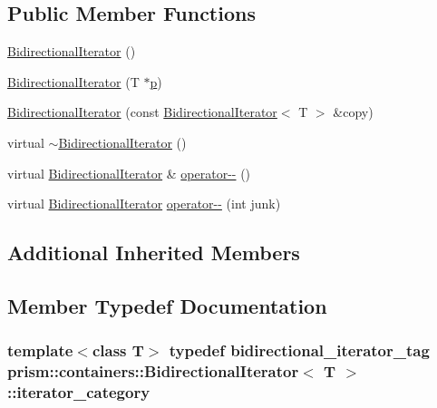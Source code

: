 \subsection*{Public Member Functions}
\begin{DoxyCompactItemize}
\item 
\hyperlink{classprism_1_1containers_1_1_bidirectional_iterator_a932401a5db7c0166a3e655dd37df9ea6}{Bidirectional\+Iterator} ()
\item 
\hyperlink{classprism_1_1containers_1_1_bidirectional_iterator_a5366bfe17fa530a679e3e43439ecec35}{Bidirectional\+Iterator} (T $\ast$\hyperlink{classprism_1_1containers_1_1_forward_iterator_afae3bf32acc98ab535b9bdb8156ba58f}{p})
\item 
\hyperlink{classprism_1_1containers_1_1_bidirectional_iterator_a421e8fc74e3aff457dc211cf14d85a6b}{Bidirectional\+Iterator} (const \hyperlink{classprism_1_1containers_1_1_bidirectional_iterator}{Bidirectional\+Iterator}$<$ T $>$ \&copy)
\item 
virtual \hyperlink{classprism_1_1containers_1_1_bidirectional_iterator_aa8283beed2192475ed3ec95c1fe319c1}{$\sim$\+Bidirectional\+Iterator} ()
\item 
virtual \hyperlink{classprism_1_1containers_1_1_bidirectional_iterator}{Bidirectional\+Iterator} \& \hyperlink{classprism_1_1containers_1_1_bidirectional_iterator_a39b0a415980fcfa4c4fa7b1b1786e77b}{operator-\/-\/} ()
\item 
virtual \hyperlink{classprism_1_1containers_1_1_bidirectional_iterator}{Bidirectional\+Iterator} \hyperlink{classprism_1_1containers_1_1_bidirectional_iterator_a1b36301da438a0f940e13df25aecdb10}{operator-\/-\/} (int junk)
\end{DoxyCompactItemize}
\subsection*{Additional Inherited Members}


\subsection{Member Typedef Documentation}
\subsubsection[{\texorpdfstring{iterator\+\_\+category}{iterator_category}}]{\setlength{\rightskip}{0pt plus 5cm}template$<$class T$>$ typedef {\bf bidirectional\+\_\+iterator\+\_\+tag} {\bf prism\+::containers\+::\+Bidirectional\+Iterator}$<$ T $>$\+::{\bf iterator\+\_\+category}}\hypertarget{classprism_1_1containers_1_1_bidirectional_iterator_a45138f8a3401db5537997b4da7632b2b}{}\label{classprism_1_1containers_1_1_bidirectional_iterator_a45138f8a3401db5537997b4da7632b2b}


